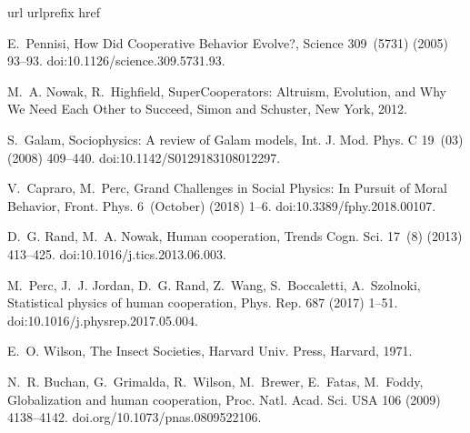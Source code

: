 \documentclass[5p,review]{elsarticle}
\begin{document}
\begin{thebibliography}{10}
\expandafter\ifx\csname url\endcsname\relax
  \def\url#1{\texttt{#1}}\fi
\expandafter\ifx\csname urlprefix\endcsname\relax\def\urlprefix{URL }\fi
\expandafter\ifx\csname href\endcsname\relax
  \def\href#1#2{#2} \def\path#1{#1}\fi


E.~Pennisi, \href{http://www.sciencemag.org/cgi/doi/10.1126/science.309.5731.93}{{How Did Cooperative Behavior Evolve?}}, Science 309~(5731) (2005) 93--93.
\newblock \href {http://dx.doi.org/10.1126/science.309.5731.93}
  {\path{doi:10.1126/science.309.5731.93}}.

M.~A. Nowak, R.~Highfield, {SuperCooperators: Altruism, Evolution, and Why We
  Need Each Other to Succeed}, Simon and Schuster, New York, 2012.

S.~Galam, {Sociophysics: A review of Galam models}, Int. J. Mod. Phys. C
  19~(03) (2008) 409--440.
\newblock \href {http://dx.doi.org/10.1142/S0129183108012297}
  {\path{doi:10.1142/S0129183108012297}}.

V.~Capraro, M.~Perc,
  \href{https://www.frontiersin.org/article/10.3389/fphy.2018.00107/full}{{Grand  Challenges in Social Physics: In Pursuit of Moral Behavior}}, Front. Phys.  6~(October) (2018) 1--6.
\newblock \href {http://dx.doi.org/10.3389/fphy.2018.00107}
  {\path{doi:10.3389/fphy.2018.00107}}.

D.~G. Rand, M.~A. Nowak,
  \href{http://linkinghub.elsevier.com/retrieve/pii/S1364661313001216}{{Human
  cooperation}}, Trends Cogn. Sci. 17~(8) (2013) 413--425.
\newblock \href {http://dx.doi.org/10.1016/j.tics.2013.06.003}
  {\path{doi:10.1016/j.tics.2013.06.003}}.

M.~Perc, J.~J. Jordan, D.~G. Rand, Z.~Wang, S.~Boccaletti, A.~Szolnoki,
  \href{http://dx.doi.org/10.1016/j.physrep.2017.05.004
  http://linkinghub.elsevier.com/retrieve/pii/S0370157317301424}{{Statistical
  physics of human cooperation}}, Phys. Rep. 687 (2017) 1--51.
\newblock  \href {http://dx.doi.org/10.1016/j.physrep.2017.05.004}
  {\path{doi:10.1016/j.physrep.2017.05.004}}.

E.~O. Wilson, {The Insect Societies}, Harvard Univ. Press, Harvard, 1971.

N.~R. Buchan, G.~Grimalda, R.~Wilson, M.~Brewer, E.~Fatas, M.~Foddy,
  {Globalization and human cooperation}, Proc. Natl. Acad. Sci. USA 106 (2009)
  4138--4142.
  \newblock  \href {https://doi.org/10.1073/pnas.0809522106}
  {\path{doi.org/10.1073/pnas.0809522106}}.




\end{thebibliography}
\end{document}
